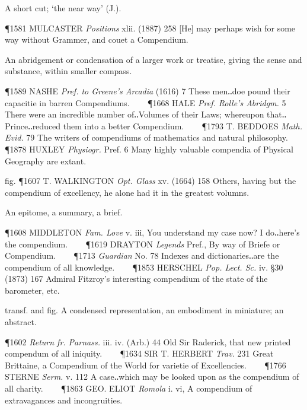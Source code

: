 \begin{description}[wide, labelwidth=!, labelindent=0pt]
\noindent {}

\vspace{-0.3cm}

\begin{myenumerate}

 A short cut; ‘the near way’ (J.).

\P 1581 MULCASTER  \textit{Positions} xlii. (1887) 258 [He] may perhaps wish for some way without Grammer, and couet a Compendium.

 An abridgement or condensation of a larger work or treatise, giving the sense and substance, within smaller compass.

\P 1589 NASHE  \textit{Pref. to Greene's Arcadia} (1616) 7 These men‥doe pound their capacitie in barren Compendiums.    
\P 1668 HALE  \textit{Pref. Rolle's Abridgm.} 5 There were an incredible number of‥Volumes of their Laws; whereupon that‥Prince‥reduced them into a better Compendium.    
\P 1793 T. BEDDOES  \textit{Math. Evid.} 79 The writers of compendiums of mathematics and natural philosophy.    
\P 1878 HUXLEY  \textit{Physiogr.} Pref. 6 Many highly valuable compendia of Physical Geography are extant.

fig. \P 1607 T. WALKINGTON  \textit{Opt. Glass} xv. (1664) 158 Others, having but the compendium of excellency, he alone had it in the greatest volumns.

 An epitome, a summary, a brief.

\P 1608 MIDDLETON  \textit{Fam. Love} v. iii, You understand my case now? I do‥here's the compendium.    
\P 1619 DRAYTON  \textit{Legends} Pref., By way of Briefe or Compendium.    
\P 1713 \textit{Guardian}  No. 78 Indexes and dictionaries‥are the compendium of all knowledge.    
\P 1853 HERSCHEL  \textit{Pop. Lect. Sc.} iv. §30 (1873) 167 Admiral Fitzroy's interesting compendium of the state of the barometer, etc.

 transf. and fig. A condensed representation, an embodiment in miniature; an abstract.

\P 1602 \textit{Return  fr. Parnass.} iii. iv. (Arb.) 44 Old Sir Raderick, that new printed compendum of all iniquity.    
\P 1634 SIR T. HERBERT  \textit{Trav.} 231 Great Brittaine, a Compendium of the World for varietie of Excellencies.    
\P 1766 STERNE  \textit{Serm.} v. 112 A case‥which may be looked upon as the compendium of all charity.    
\P 1863 GEO. ELIOT  \textit{Romola} i. vi, A compendium of extravagances and incongruities.


\end{myenumerate}
\end{description}
